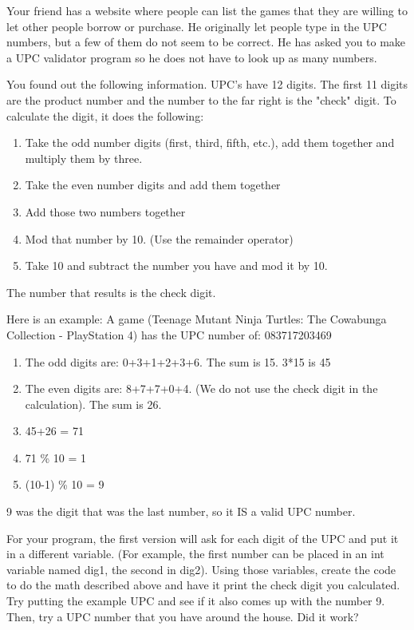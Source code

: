 Your friend has a website where people can list the games that
they are willing to let other people borrow or purchase. He
originally let people type in the UPC numbers, but a few of 
them do not seem to be correct. He has asked you to make a 
UPC validator program so he does not have to look up as many 
numbers.

You found out the following information. UPC's have 12 digits.
The first 11 digits are the product number and the number to the
far right is the "check" digit. To calculate the digit, it does
the following:
\begin{enumerate}
    \item Take the odd number digits (first, third, fifth, etc.), add them together and multiply them by three.
    \item Take the even number digits and add them together
    \item Add those two numbers together
    \item Mod that number by 10. (Use the remainder operator)
    \item Take 10 and subtract the number you have and mod it by 10. 
\end{enumerate}
The number that results is the check digit.

Here is an example: A game (Teenage Mutant Ninja Turtles: The Cowabunga Collection - PlayStation 4) has the UPC number of:
083717203469
\begin{enumerate}
    \item The odd digits are: 0+3+1+2+3+6. The sum is 15. 3*15 is 45
    \item The even digits are: 8+7+7+0+4. (We do not use the check digit in the calculation). The sum is 26.
    \item 45+26 = 71
    \item 71 \% 10 = 1
    \item (10-1) \% 10 = 9
\end{enumerate}
9 was the digit that was the last number, so it IS a valid UPC 
number.

For your program, the first version will ask for each digit
of the UPC and put it in a different variable. (For example,
the first number can be placed in an int variable named dig1, 
the second in dig2). Using those variables, create the code
to do the math described above and have it print the check
digit you calculated. Try putting the example UPC
and see if it also comes up with the number 9. Then, try a
UPC number that you have around the house. Did it work?

